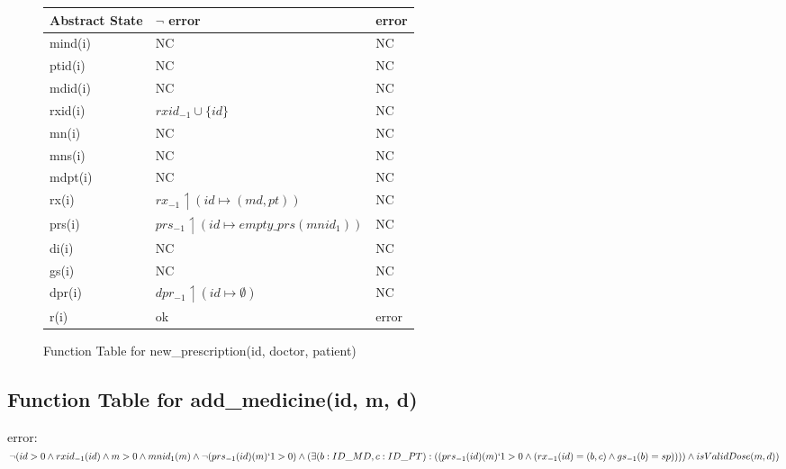 \begin{figure}[h]
\begin{center}

\begin{tabular}{|l|l|l|}
\hline
Abstract State & $\neg$ error & error \\ \hline
mind(i)        &     NC      & NC    \\ \hline
ptid(i)        &       NC    & NC    \\ \hline
mdid(i)        &     NC      & NC    \\ \hline
rxid(i)        &     $rxid_{-1} \cup \{id\}$      & NC    \\ \hline
mn(i)          &      NC     & NC    \\ \hline
mns(i)         &     NC      & NC    \\ \hline
mdpt(i)        &    NC       & NC    \\ \hline
rx(i)          &      $rx_{-1} \upharpoonleft (id \mapsto (md, pt))$     & NC    \\ \hline
prs(i)         &      $prs_{-1} \upharpoonleft (id \mapsto empty\_prs(mnid_{1}))$      & NC    \\ \hline
di(i)          &        NC   & NC    \\ \hline
gs(i)          &       NC    & NC    \\ \hline
dpr(i)         &     $dpr_{-1} \upharpoonleft (id \mapsto \emptyset)$      & NC    \\ \hline
r(i)           & ok        & error \\ \hline
\end{tabular}

\caption{Function Table for new\_prescription(id, doctor, patient)}
\label{ft-np}
\end{center}
\end{figure}

\newpage

\subsection{Function Table for add\_medicine(id, m, d)}

error: $\neg (id > 0 \wedge rxid_{-1}(id) \wedge m > 0  \wedge mnid_{1}(m) \wedge \neg  (prs_{-1}(id)(m)`1 > 0) \wedge (\exists (b: ID\_MD, c: ID\_PT): ((prs_{-1}(id)(m)`1 > 0 \wedge (rx_{-1}(id) = (b,c) \wedge gs_{-1}(b) = sp )))) \wedge isValidDose(m,d))$

